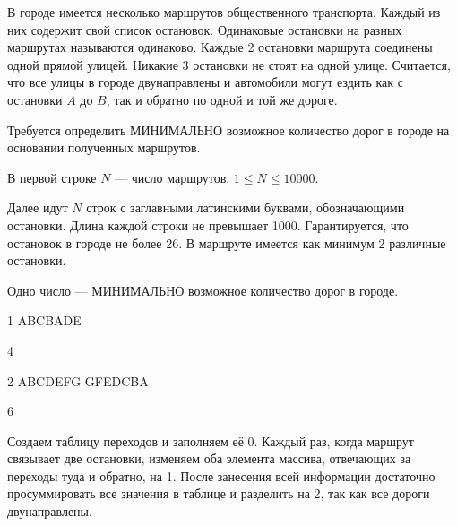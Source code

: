 
В городе имеется несколько маршрутов общественного транспорта. Каждый из них содержит свой список остановок. Одинаковые остановки на разных маршрутах называются одинаково. Каждые 2 остановки маршрута соединены одной прямой улицей. Никакие 3 остановки не стоят на одной улице. Считается, что все улицы в городе двунаправлены и автомобили могут ездить как с остановки $A$ до $B$, так и обратно по одной и той же дороге.

Требуется определить МИНИМАЛЬНО возможное количество дорог в городе на основании полученных маршрутов.


В первой строке $N$ — число маршрутов. $1\leq N\leq 10000$.

Далее идут $N$ строк с заглавными латинскими буквами, обозначающими остановки. Длина каждой строки не превышает 1000. Гарантируется, что остановок в городе не более 26. В маршруте имеется как минимум 2 различные остановки.

\outputfmtSection

Одно число — МИНИМАЛЬНО возможное количество дорог в городе.


\begin{myverbbox}[\small]{\vinput}
    1
    ABCBADE
\end{myverbbox}
\begin{myverbbox}[\small]{\voutput}
    4 
\end{myverbbox}


\begin{myverbbox}[\small]{\vinput}
    2
    ABCDEFG
    GFEDCBA
\end{myverbbox}
\begin{myverbbox}[\small]{\voutput}
    6
\end{myverbbox}

\solutionSection

Создаем таблицу переходов и заполняем её 0. Каждый раз, когда маршрут связывает две остановки, изменяем оба элемента массива, отвечающих за переходы туда и обратно, на 1. После занесения всей информации достаточно просуммировать все значения в таблице и разделить на 2, так как все дороги двунаправлены.

